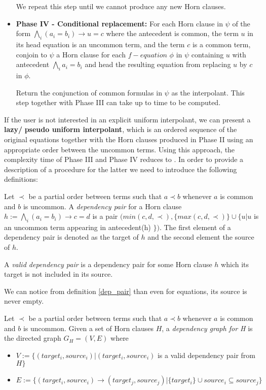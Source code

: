 \begin{itemize}
    We repeat this step until we cannot produce any new 
    Horn clauses. 

  \item \textbf{Phase IV - Conditional replacement:} 
    For each Horn clause in $\psi$ of the form 
    $\bigwedge_i(a_i = b_i) 
    \rightarrow u = c$ 
    where the antecedent is common, the term $u$ in its 
    head equation is an uncommon term,
    and the term $c$ is a common term,
    conjoin to $\psi$ a Horn clause for each 
    $f-equation$ $\phi$
    in $\psi$ containing $u$
    with 
    antecedent $\bigwedge_i a_i = b_i$ and head the 
    resulting equation from replacing $u$ by $c$
    in $\phi$.

    Return the conjunction of common formulas in $\psi$
    as the interpolant. This step together with 
    Phase III can take up
    to  time to be computed.
\end{itemize}

If the user is not interested in an explicit uniform interpolant, 
we can present a \textbf{lazy/} 
\textbf{pseudo uniform interpolant}, which is an ordered 
sequence of the original equations 
together with the Horn clauses produced in Phase II 
using an appropriate order between the uncommon terms.
Using this approach, the complexity time of Phase III
and Phase IV reduces to .
In order to
provide a description of a procedure for the latter we need
to introduce the following definitions:

\begin{definition}\label{dep_pair}
  Let $\prec$ be a partial order between terms 
  such that $a \prec b$ whenever 
  $a$ is common and $b$ is uncommon. A \emph{dependency pair}
  for a Horn clause $h := \bigwedge_i (a_i = b_i) \rightarrow c = d$
  is a pair $(min(c, d, \prec), \{max(c, d, \prec)\} \cup \{ u | u$ 
  is an uncommon term appearing in antecedent(h) $\})$.
  The first element of a dependency pair is denoted as the
  target of $h$ and the second element the source of $h$.

  A \emph{valid dependency pair} is a dependency pair for some
  Horn clause $h$ which its target is not included in its
  source.
\end{definition}

We can notice from definition \ref{dep_pair} than even for 
equations, its source is never empty. 

\begin{definition}\label{dep_graph}
  Let $\prec$ be a partial order between terms 
  such that $a \prec b$ whenever 
  $a$ is common and $b$ is uncommon. Given a set of 
  Horn clauses $H$, a \emph{dependency graph for H}
  is the directed graph $G_H = (V, E)$ where
  \begin{itemize}
    \item $V := \{(target_i, source_i) | (target_i, source_i)$ 
      is a valid dependency pair from $H \}$
    \item $E := \{(target_i, source_i) \rightarrow (target_j, source_j) | 
        \{target_i\} \cup source_i \subseteq source_j
      \}$ 
  \end{itemize}
\end{definition}

